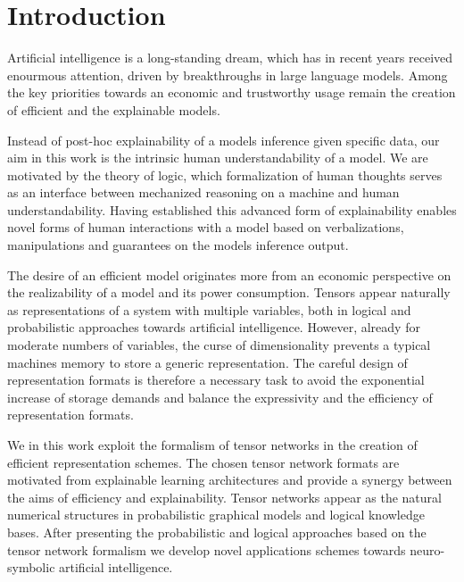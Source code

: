 \chapter{Introduction}\label{cha:introduction}

Artificial intelligence is a long-standing dream, which has in recent years received enourmous attention, driven by breakthroughs in large language models.
Among the key priorities towards an economic and trustworthy usage remain the creation of efficient and the explainable models.

Instead of post-hoc explainability of a models inference given specific data, our aim in this work is the intrinsic human understandability of a model.
We are motivated by the theory of logic, which formalization of human thoughts serves as an interface between mechanized reasoning on a machine and human understandability.
Having established this advanced form of explainability enables novel forms of human interactions with a model based on verbalizations, manipulations and guarantees on the models inference output.

The desire of an efficient model originates more from an economic perspective on the realizability of a model and its power consumption.
Tensors appear naturally as representations of a system with multiple variables, both in logical and probabilistic approaches towards artificial intelligence. %
However, already for moderate numbers of variables, the curse of dimensionality prevents a typical machines memory to store a generic representation.
The careful design of representation formats is therefore a necessary task to avoid the exponential increase of storage demands and balance the expressivity and the efficiency of representation formats.

We in this work exploit the formalism of tensor networks in the creation of efficient representation schemes.
The chosen tensor network formats are motivated from explainable learning architectures and provide a synergy between the aims of efficiency and explainability.
Tensor networks appear as the natural numerical structures in probabilistic graphical models and logical knowledge bases.
After presenting the probabilistic and logical approaches based on the tensor network formalism we develop novel applications schemes towards neuro-symbolic artificial intelligence.


